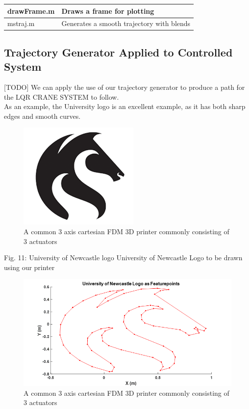 \documentclass{UoNMCHA}
\numberwithin{equation}{section}
\begin{document}
\begin{table}[H]
\begin{centering}
\begin{tabular}{ll}
		drawFrame.m                 & Draws a frame for plotting                                                                                                     \\ \hline
		mstraj.m                    & Generates a smooth trajectory with blends \\ \hline                                                                                      
	\end{tabular}
\end{centering}
\end{table}

\subsection{Trajectory Generator Applied to Controlled System}

[TODO] We can apply the use of our trajectory generator to produce a path for the LQR CRANE SYSTEM to follow. \\
As an example, the University logo is an excellent example, as it has both sharp edges and smooth curves. 


\begin{figure}[H]
	\begin{center}
		\includegraphics[width=.5\linewidth]{figs/Picture21}
		\caption{A  common 3 axis cartesian FDM 3D printer commonly consisting of 3 actuators}
		\label{figs/Picture21}
	\end{center}
\end{figure}

 
Fig. 11: University of Newcastle logo
University of Newcastle Logo to be drawn using our printer

\begin{figure}[H]
	\begin{center}
		\includegraphics[width=.5\linewidth]{figs/Picture22}
		\caption{A  common 3 axis cartesian FDM 3D printer commonly consisting of 3 actuators}
		\label{figs/Picture22}
	\end{center}
\end{figure}
\end{document}
